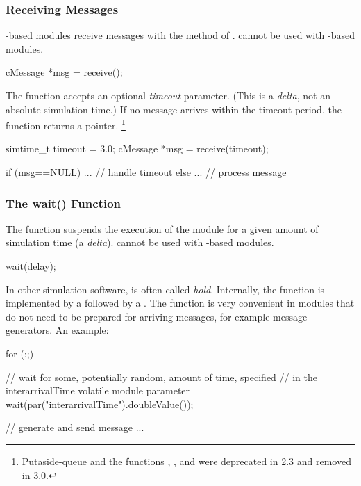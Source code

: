 \subsubsection{Receiving Messages}
\label{sec:simple-modules:receiving-messages}

-based modules receive messages with the 
method of .  cannot be used with
-based modules.

\begin{cpp}
cMessage *msg = receive();
\end{cpp}

The  function accepts an optional \textit{timeout}
parameter. (This is a \textit{delta}, not an
absolute simulation time.) If no message arrives within the timeout
period, the function returns a  pointer.
    \footnote{Putaside-queue and the functions ,
    , and  were deprecated
    in {\opp} 2.3 and removed in {\opp} 3.0.}

\begin{cpp}
simtime_t timeout = 3.0;
cMessage *msg = receive(timeout);

if (msg==NULL)
{
    ...   // handle timeout
}
else
{
    ...  // process message
}
\end{cpp}

\subsubsection{The wait() Function}
\label{sec:simple-modules:wait}

The  function suspends the execution of the module for a
given amount of simulation time (a \textit{delta}).  cannot
be used with -based modules.

\begin{cpp}
wait(delay);
\end{cpp}

In other simulation software,  is often called \textit{hold}.
Internally, the  function is implemented by a
 followed by a .
The  function is very convenient in modules that do not need
to be prepared for arriving messages, for example message generators.
An example:

\begin{cpp}
for (;;)
{
    // wait for some, potentially random, amount of time, specified
    // in the interarrivalTime volatile module parameter
    wait(par("interarrivalTime").doubleValue());

    // generate and send message
    ...
}
\end{cpp}

